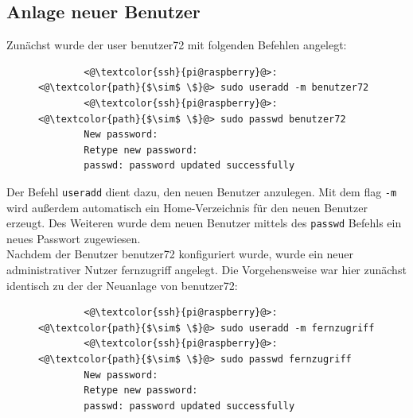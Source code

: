 \documentclass[a4paper, 11pt]{scrartcl}
\begin{document}
\subsection{Anlage neuer Benutzer}\label{ch:user_add}
Zunächst wurde der user \glqq benutzer72\grqq{} mit folgenden Befehlen angelegt:
\begin{figure}[H]
    \begin{mdframed}[backgroundcolor=bbg]
        \begin{lstlisting}
        <@\textcolor{ssh}{pi@raspberry}@>:<@\textcolor{path}{$\sim$ \$}@> sudo useradd -m benutzer72
        <@\textcolor{ssh}{pi@raspberry}@>:<@\textcolor{path}{$\sim$ \$}@> sudo passwd benutzer72
        New password:
        Retype new password:
        passwd: password updated successfully
        \end{lstlisting}
    \end{mdframed}
    \label{lst:user_72}
\end{figure}
Der Befehl \lstinline[basicstyle={\small\ttfamily\color{black}}]|useradd| dient dazu, den neuen Benutzer anzulegen. Mit dem flag \lstinline[basicstyle={\small\ttfamily\color{black}}]|-m| wird außerdem
automatisch ein Home-Verzeichnis für den neuen Benutzer erzeugt. Des Weiteren wurde dem neuen Benutzer mittels des \lstinline[basicstyle={\small\ttfamily\color{black}}]|passwd| Befehls ein neues Passwort
zugewiesen.
\\
Nachdem der Benutzer benutzer72 konfiguriert wurde, wurde ein neuer administrativer Nutzer \glqq fernzugriff\grqq{} angelegt. Die Vorgehensweise war hier zunächst identisch zu der der Neuanlage von
benutzer72:
\begin{figure}[H]
    \begin{mdframed}[backgroundcolor=bbg]
        \begin{lstlisting}
        <@\textcolor{ssh}{pi@raspberry}@>:<@\textcolor{path}{$\sim$ \$}@> sudo useradd -m fernzugriff
        <@\textcolor{ssh}{pi@raspberry}@>:<@\textcolor{path}{$\sim$ \$}@> sudo passwd fernzugriff
        New password:
        Retype new password:
        passwd: password updated successfully
        \end{lstlisting}
    \end{mdframed}
    \label{lst:user_fernzugriff}
\end{figure}
\end{document}
